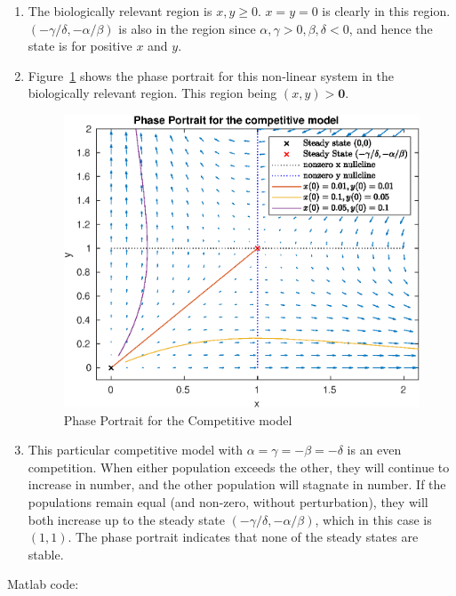 \documentclass{/home/janmebows/Documents/LatexTemplates/myassignment}
\begin{document}
\begin{enumerate}
\begin{enumerate}
		\item %
		The biologically relevant region is $x,y \geq 0$. $x=y=0$ is clearly in this region.
		$(-\gamma/\delta,-\alpha/\beta)$ is also in the region since $\alpha,\gamma>0, \beta,\delta <0$, and hence the state is for positive $x$ and $y$.
		\item %
		Figure~\ref{fig:phaseportrait2} shows the phase portrait for this non-linear system in the biologically relevant region. This region being $(x,y) > \mathbf{0}$.
		\begin{figure}[h]
			\centering
			\label{fig:phaseportrait2}
			\includegraphics[width=\linewidth]{ODEsA3Q2d}
			\caption{Phase Portrait for the Competitive model}
		\end{figure}
		\item %
		This particular competitive model with $\alpha = \gamma = -\beta = -\delta$ is an even competition. When either population exceeds the other, they will continue to increase in number, and the other population will stagnate in number. If the populations remain equal (and non-zero, without perturbation), they will both increase up to the steady state $(-\gamma/\delta,-\alpha/\beta)$, which in this case is $(1,1)$. The phase portrait indicates that none of the steady states are stable.
	\end{enumerate}
\end{enumerate}
\clearpage
Matlab code:




\clearpage

\end{document}
